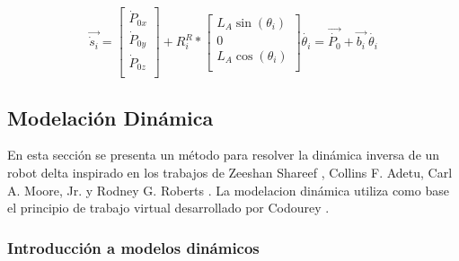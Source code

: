         \begin{equation}
                  \overrightarrow{\dot{s}_{i}}= \left[ \begin{matrix}
                \dot{P}_{0x}\\
                \dot{P}_{0y}\\
                \dot{P}_{0z}\\
                \end{matrix}
                 \right] +R_{i}^{R}\ast \left[ \begin{matrix}
                L_{A}\sin  \left(  \theta _{i} \right) \\
                0\\
                L_{A}\cos  \left(  \theta _{i} \right) \\
                \end{matrix}
                 \right] \dot{ \theta _{i}}=\overrightarrow{\dot{P_{0}}}+\overrightarrow{b_{i}}~\dot{ \theta _{i}} 
            \label{eq:cap4_MB_19}
        \end{equation} 

        


        








    \newpage

    \subsection{Modelación Dinámica}
    
        En esta sección se presenta un método para resolver la dinámica inversa de un robot delta inspirado en los trabajos de Zeeshan Shareef \cite{Path_Planning_and_Trajectory_Optimization}, Collins F. Adetu, Carl A. Moore, Jr. y Rodney G. Roberts \cite{dynamic_omega3}. La modelacion dinámica utiliza como base el principio de trabajo virtual desarrollado por Codourey \cite{Codourey_decoupling}.

 
        
        \subsubsection{Introducción a modelos dinámicos}
    
